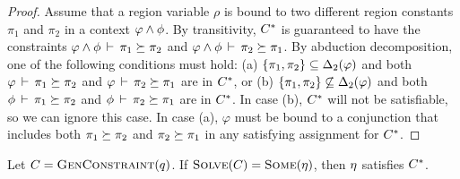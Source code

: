 \begin{proof}
  Assume that a region variable $\rho$ is bound to two different
  region constants $\pi_1$ and $\pi_2$ in a context $\varphi \wedge \phi$.
  By transitivity, ${C}^*$ is guaranteed to have the constraints
  $\varphi \wedge \phi\,\vdash\,\pi_1 \succeq \pi_2$
  and $\varphi \wedge \phi\,\vdash\,\pi_2 \succeq \pi_1$.
  By abduction decomposition, one of the following conditions must hold:
  (a) $\{ \pi_1, \pi_2 \} \subseteq {\Delta_2}(\varphi)$ and
  both $\varphi\,\vdash\,\pi_1 \succeq \pi_2$ and
  $\varphi\,\vdash\,\pi_2 \succeq \pi_1$ are in ${C}^*$, or
  (b) $\{ \pi_1, \pi_2 \} \not\subseteq {\Delta_2}(\varphi)$ and
  both $\phi\,\vdash\,\pi_1 \succeq \pi_2$ and
  $\phi\,\vdash\,\pi_2 \succeq \pi_1$ are in ${C}^*$.
  In case (b), ${C}^*$ will not be satisfiable, so we can ignore this case.
  In case (a), $\varphi$ must be bound to a conjunction that includes both
  $\pi_1 \succeq \pi_2$ and $\pi_2 \succeq \pi_1$ in any satisfying assignment
  for ${C}^*$.
\end{proof}

% 

\begin{theorem}
\label{thm:constraint-solver-soundness}
Let $C = \textsc{GenConstraint}(q)$.
If $\textsc{Solve}(C) = \textsc{Some}(\eta)$,
then $\eta$ satisfies ${C}^*$.
\end{theorem}

